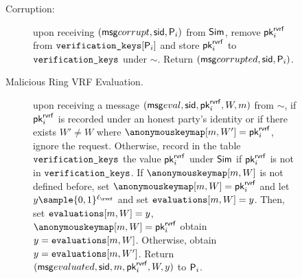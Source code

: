 \begin{figure}
\begin{tcolorbox}
{\begin{description}
				\item [Corruption:]  
				upon receiving $ (\mathsf{msg}{corrupt}, \textsf{sid}, \mathsf{P}_i) $ from $ \mathsf{Sim} $, remove $ \mathsf{pk}^{\mathsf{rvrf}}_i $ from $ \texttt{verification\_keys}[\mathsf{P}_i] $ and store $ \mathsf{pk}^{\mathsf{rvrf}}_i $ to $ \texttt{verification\_keys} $ under $ \sim $. Return $ (\mathsf{msg}{corrupted}, \textsf{sid},\mathsf{P}_i) $.
				\item[Malicious Ring VRF Evaluation.] upon receiving a message $(\mathsf{msg}{eval}, \textsf{sid}, \mathsf{pk}^{\mathsf{rvrf}}_i, W, m)$ from $\sim$, if $ \mathsf{pk}^{\mathsf{rvrf}}_i $ is recorded under an honest party's identity or if there exists $ W'\neq W $ where $ \anonymouskeymap[m,W'] = \pkrvrf_i $, ignore the request.
				Otherwise, record in the table $\texttt{verification\_keys}$ the value $\mathsf{pk}^{\mathsf{rvrf}}_i$ under $\mathsf{Sim}$ if $ \mathsf{pk}^{\mathsf{rvrf}}_i $ is not in $ \texttt{verification\_keys} $. If  $\anonymouskeymap[m,W]  $ is not defined before, set $ \anonymouskeymap[m,W] = \pkrvrf_i $ and let   $y \sample \bin^{\ell_\rvrf}$ and set $ \texttt{evaluations}[m, W] = y$.
				Then, set $ \texttt{evaluations}[m, W] = y$, $ \anonymouskeymap[m,W] = \pkrvrf_i $ obtain $ y =  \texttt{evaluations}[m, W]$. Otherwise, obtain $ y = \texttt{evaluations}[m, W'] $.
				Return $(\mathsf{msg}{evaluated}, \textsf{sid},  m, \mathsf{pk}^{\mathsf{rvrf}}_i,W, y)$ to $ \mathsf{P}_i $.
				
				
				

\end{description}}
\end{tcolorbox}
\end{figure}
